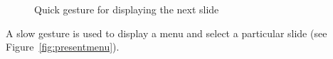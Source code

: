 \documentclass[12pt,a4paper,oneside,openright]{book}
\newcommand{\fig}[1]{Figure~\ref{fig:#1}}
\begin{document}
\begin{CJK}{UTF8}{}
\begin{figure}[htbp]
\begin{center}
\begin{minipage}[t]{.47\textwidth}
\begin{center}
      \end{center}
     \end{minipage}
     \begin{minipage}[t]{.47\textwidth}
      \begin{center}
      \end{center}
     \end{minipage}
    \caption{Quick gesture for displaying the next slide\label{fig:presentnext}}
  \end{center}
\end{figure}
A slow gesture is used to display a menu and select a particular slide (see \fig{presentmenu}).
\begin{figure}[htbp]
  \begin{center}
    \\

\end{center}
\end{figure}
\end{CJK}
\end{document}
